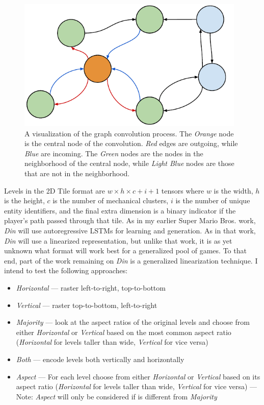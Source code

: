 \documentclass[a4paper]{article}
\begin{document}
\begin{figure}[ht]
\centering
    \includegraphics[width=0.97\textwidth]{figures/Din_Graph_Detail.pdf} 
   
   
    \caption{A visualization of the graph convolution process. The \textit{Orange} node is the central node of the convolution. \textit{Red} edges are outgoing, while \textit{Blue} are incoming.  The \textit{Green} nodes are the nodes in the neighborhood of the central node, while \textit{Light Blue} nodes are those that are not in the neighborhood. }
  \label{fig:convolution}
  \end{figure}
  
Levels in the 2D Tile format are $w \times h \times c+i+1$ tensors where $w$ is the width, $h$ is the height, $c$ is the number of mechanical clusters, $i$ is the number of unique entity identifiers, and the final extra dimension is a binary indicator if the player's path passed through that tile.  As in my earlier Super Mario Bros. work, \textit{Din} will use autoregressive LSTMs for learning and generation.  As in that work, \textit{Din} will use a linearized representation, but unlike that work, it is as yet unknown what format will work best for a generalized pool of games.  To that end, part of the work remaining on \textit{Din} is a generalized linearization technique.  I intend to test the following approaches:

\begin{itemize}
\item \textit{Horizontal}  --- raster left-to-right, top-to-bottom
\item \textit{Vertical}  --- raster  top-to-bottom, left-to-right
\item \textit{Majority}  --- look at the aspect ratios of the original levels and choose from either \textit{Horizontal} or \textit{Vertical} based on the most common aspect ratio (\textit{Horizontal} for levels taller than wide, \textit{Vertical} for vice versa)
\item \textit{Both}  --- encode levels both vertically and horizontally
\item \textit{Aspect}  --- For each level choose from either \textit{Horizontal} or \textit{Vertical} based on its aspect ratio (\textit{Horizontal} for levels taller than wide, \textit{Vertical} for vice versa) --- Note: \textit{Aspect} will only be considered if is different from \textit{Majority} 
\end{itemize}
\end{document}
